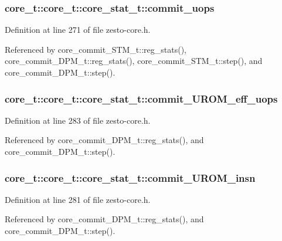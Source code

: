 \subsubsection[{commit\_\-uops}]{ core\_\-t::core\_\-t::core\_\-stat\_\-t::commit\_\-uops}\label{structcore__t_1_1core__stat__t_92a5adf70cb88182f89436f5be116715}




Definition at line 271 of file zesto-core.h.

Referenced by core\_\-commit\_\-STM\_\-t::reg\_\-stats(), core\_\-commit\_\-DPM\_\-t::reg\_\-stats(), core\_\-commit\_\-STM\_\-t::step(), and core\_\-commit\_\-DPM\_\-t::step().
\subsubsection[{commit\_\-UROM\_\-eff\_\-uops}]{ core\_\-t::core\_\-t::core\_\-stat\_\-t::commit\_\-UROM\_\-eff\_\-uops}\label{structcore__t_1_1core__stat__t_bf911fc8f2203830b120207411ea1260}




Definition at line 283 of file zesto-core.h.

Referenced by core\_\-commit\_\-DPM\_\-t::reg\_\-stats(), and core\_\-commit\_\-DPM\_\-t::step().
\subsubsection[{commit\_\-UROM\_\-insn}]{ core\_\-t::core\_\-t::core\_\-stat\_\-t::commit\_\-UROM\_\-insn}\label{structcore__t_1_1core__stat__t_f74f8ee918a3458e8c6eeda7519f1967}




Definition at line 281 of file zesto-core.h.

Referenced by core\_\-commit\_\-DPM\_\-t::reg\_\-stats(), and core\_\-commit\_\-DPM\_\-t::step().
